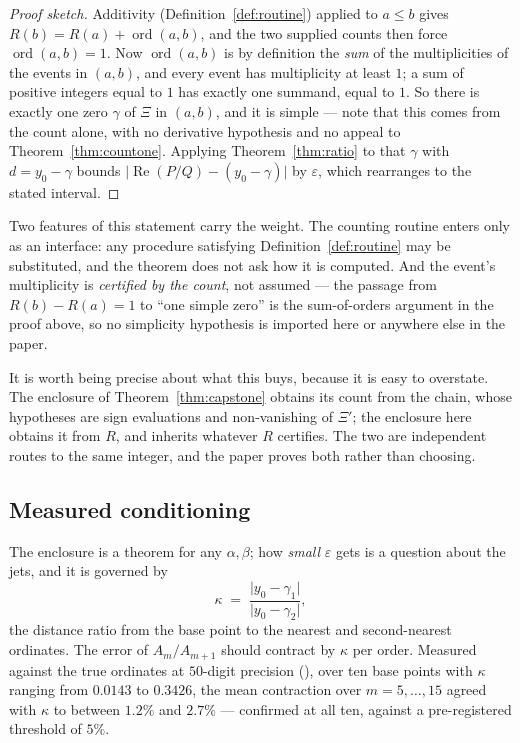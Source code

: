 \documentclass[11pt]{article}
\theoremstyle{plain}
\theoremstyle{definition}
\theoremstyle{remark}
\newcommand{\lean}[1]{\texttt{\detokenize{#1}}}
\DeclareMathOperator{\ord}{ord}
\begin{document}
\begin{proof}[Proof sketch]
Additivity (Definition~\ref{def:routine}) applied to $a\le b$ gives
$R(b)=R(a)+\ord(a,b)$, and the two supplied counts then force $\ord(a,b)=1$. Now
$\ord(a,b)$ is by definition the \emph{sum} of the multiplicities of the events in
$(a,b)$, and every event has multiplicity at least $1$; a sum of positive integers
equal to $1$ has exactly one summand, equal to $1$. So there is exactly one zero
$\gamma$ of $\Xi$ in $(a,b)$, and it is simple --- note that this comes from the count
alone, with no derivative hypothesis and no appeal to
Theorem~\ref{thm:countone}. Applying Theorem~\ref{thm:ratio} to that $\gamma$ with
$d=y_0-\gamma$ bounds $\lvert\operatorname{Re}(P/Q)-(y_0-\gamma)\rvert$ by
$\varepsilon$, which rearranges to the stated interval.
\end{proof}

\noindent
Two features of this statement carry the weight. The counting routine enters only as
an interface: any procedure satisfying Definition~\ref{def:routine} may be substituted,
and the theorem does not ask how it is computed. And the event's multiplicity is
\emph{certified by the count}, not assumed --- the passage from $R(b)-R(a)=1$ to ``one
simple zero'' is the sum-of-orders argument in the proof above, so no simplicity
hypothesis is imported here or anywhere else in the paper.

It is worth being precise about what this buys, because it is easy to overstate. The
enclosure of Theorem~\ref{thm:capstone} obtains its count from the chain, whose
hypotheses are sign evaluations and non-vanishing of $\Xi'$; the enclosure here obtains
it from $R$, and inherits whatever $R$ certifies. The two are independent routes to the
same integer, and the paper proves both rather than choosing.

\subsection*{Measured conditioning}
The enclosure is a theorem for any $\alpha,\beta$; how \emph{small} $\varepsilon$ gets
is a question about the jets, and it is governed by
\[
  \kappa\;=\;\frac{\lvert y_0-\gamma_1\rvert}{\lvert y_0-\gamma_2\rvert},
\]
the distance ratio from the base point to the nearest and second-nearest ordinates.
The error of $A_m/A_{m+1}$ should contract by $\kappa$ per order. Measured against the
true ordinates at $50$-digit precision
(\lean{extractor/checks/jet_sweep.py}), over ten base points with $\kappa$ ranging from
$0.0143$ to $0.3426$, the mean contraction over $m=5,\dots,15$ agreed with $\kappa$ to
between $1.2\%$ and $2.7\%$ --- confirmed at all ten, against a pre-registered
threshold of $5\%$.
\end{document}
